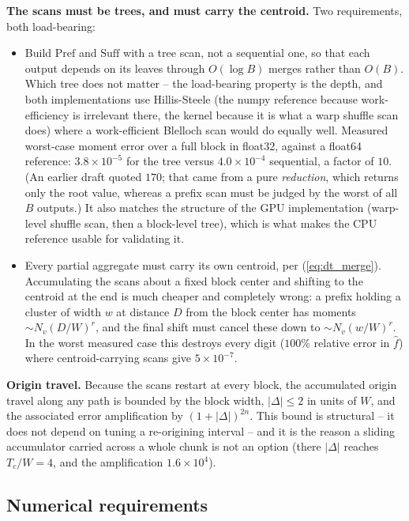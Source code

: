 \documentclass{article}
\numberwithin{equation}{section}   %
\begin{document}
{\bf The scans must be trees, and must carry the centroid.}  Two requirements, both load-bearing:
\begin{itemize}
\item Build $\mathrm{Pref}$ and $\mathrm{Suff}$ with a tree scan, not a sequential one, so that each output
depends on its leaves through $O(\log B)$ merges rather than $O(B)$.  Which tree does not matter -- the
load-bearing property is the depth, and both implementations use Hillis-Steele (the numpy reference because
work-efficiency is irrelevant there, the kernel because it is what a warp shuffle scan does) where a
work-efficient Blelloch scan would do equally well.  Measured
worst-case moment error over a full block in float32, against a float64 reference: $3.8\times10^{-5}$ for the
tree versus $4.0\times10^{-4}$ sequential, a factor of $10$.  (An earlier draft quoted $170$; that came from a
pure {\em reduction}, which returns only the root value, whereas a prefix scan must be judged by the worst of
all $B$ outputs.)  It also matches the structure of the GPU
implementation (warp-level shuffle scan, then a block-level tree), which is what makes the CPU reference
usable for validating it.
\item Every partial aggregate must carry its own centroid, per (\ref{eq:dt_merge}).  Accumulating the scans
about a fixed block center and shifting to the centroid at the end is much cheaper and completely wrong: a
prefix holding a cluster of width $w$ at distance $D$ from the block center has moments $\sim N_v (D/W)^r$,
and the final shift must cancel these down to $\sim N_v (w/W)^r$.  In the worst measured case this destroys
every digit ($100\%$ relative error in $\hat f$) where centroid-carrying scans give $5\times10^{-7}$.
\end{itemize}

{\bf Origin travel.}  Because the scans restart at every block, the accumulated origin travel along any path
is bounded by the block width, $|\Delta| \le 2$ in units of $W$, and the associated error amplification by
$(1+|\Delta|)^{2n}$.  This bound is structural -- it does not depend on tuning a re-origining interval -- and
it is the reason a sliding accumulator carried across a whole chunk is not an option (there $|\Delta|$ reaches
$T_c/W = 4$, and the amplification $1.6\times10^4$).

\subsection{Numerical requirements}
\label{sec:dt_numerics}
\end{document}
